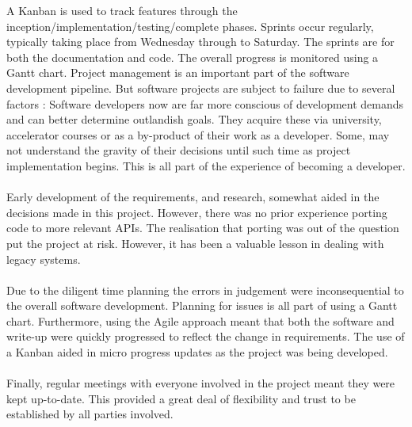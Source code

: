   A Kanban is used to track features through the inception/implementation/testing/complete phases. Sprints occur regularly, typically taking place from Wednesday through to Saturday. The sprints are for both the documentation and code. The overall progress is monitored using a Gantt chart.
  Project management is an important part of the software development pipeline. But software projects are subject to failure due to several factors \cite{software_failure}:
%
  Software developers now are far more conscious of development demands and can better determine outlandish goals. They acquire these via university, accelerator courses or as a by-product of their work as a developer. Some, may not understand the gravity of their decisions until such time as project implementation begins. This is all part of the experience of becoming a developer.\\\\
  Early development of the requirements, and research, somewhat aided in the decisions made in this project. However, there was no prior experience porting code to more relevant APIs. The realisation that porting was out of the question put the project at risk. However, it has been a valuable lesson in dealing with legacy systems.\\\\
  Due to the diligent time planning the errors in judgement were inconsequential to the overall software development. Planning for issues is all part of using a Gantt chart. Furthermore, using the Agile approach meant that both the software and write-up were quickly progressed to reflect the change in requirements. The use of a Kanban aided in micro progress updates as the project was being developed.\\\\
  Finally, regular meetings with everyone involved in the project meant they were kept up-to-date. This provided a great deal of flexibility and trust to be established by all parties involved.

